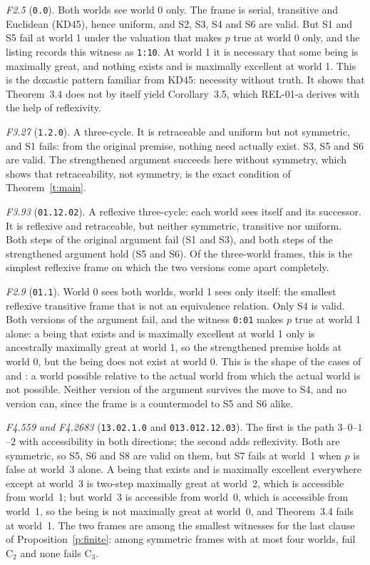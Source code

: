 \documentclass{situationist-preprint}
\begin{document}
\emph{F2.5} (\texttt{0.0}). Both worlds see world 0 only. The frame is serial, transitive and Euclidean (KD45), hence uniform, and S2, S3, S4 and S6 are valid. But S1 and S5 fail at world 1 under the valuation that makes $p$ true at world 0 only, and the listing records this witness as \texttt{1:10}. At world 1 it is necessary that some being is maximally great, and nothing exists and is maximally excellent at world 1. This is the doxastic pattern familiar from KD45: necessity without truth. It shows that Theorem~3.4 does not by itself yield Corollary~3.5, which REL-01-a derives with the help of reflexivity.

\emph{F3.27} (\texttt{1.2.0}). A three-cycle. It is retraceable and uniform but not symmetric, and S1 fails: from the original premise, nothing need actually exist. S3, S5 and S6 are valid. The strengthened argument succeeds here without symmetry, which shows that retraceability, not symmetry, is the exact condition of Theorem~\ref{t:main}.

\emph{F3.93} (\texttt{01.12.02}). A reflexive three-cycle: each world sees itself and its successor. It is reflexive and retraceable, but neither symmetric, transitive nor uniform. Both steps of the original argument fail (S1 and S3), and both steps of the strengthened argument hold (S5 and S6). Of the \stNThree{} three-world frames, this is the simplest reflexive frame on which the two versions come apart completely.

\emph{F2.9} (\texttt{01.1}). World 0 sees both worlds, world 1 sees only itself: the smallest reflexive transitive frame that is not an equivalence relation. Only S4 is valid. Both versions of the argument fail, and the witness \texttt{0:01} makes $p$ true at world 1 alone: a being that exists and is maximally excellent at world 1 only is ancestrally maximally great at world 1, so the strengthened premise holds at world 0, but the being does not exist at world 0. This is the shape of the cases of \citet{Chandler1976} and \citet{Salmon1989}: a world possible relative to the actual world from which the actual world is not possible. Neither version of the argument survives the move to S4, and no version can, since the frame is a countermodel to S5 and S6 alike.

\emph{F4.559 and F4.2683} (\texttt{13.02.1.0} and \texttt{013.012.12.03}). The first is the path $3$--$0$--$1$--$2$ with accessibility in both directions; the second adds reflexivity. Both are symmetric, so S5, S6 and S8 are valid on them, but S7 fails at world~1 when $p$ is false at world~3 alone. A being that exists and is maximally excellent everywhere except at world~3 is two-step maximally great at world~2, which is accessible from world~1; but world~3 is accessible from world~0, which is accessible from world~1, so the being is not maximally great at world~0, and Theorem~3.4 fails at world~1. The two frames are among the smallest witnesses for the last clause of Proposition~\ref{p:finite}: among symmetric frames with at most four worlds, \stNumBnotSSeven{} fail C$_2$ and none fails C$_3$.
\end{document}
